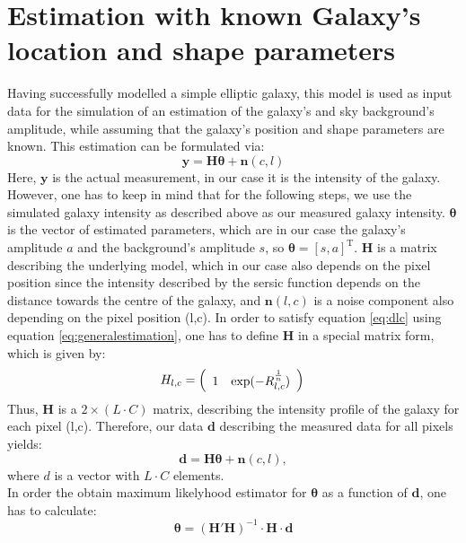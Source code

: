 \section{Estimation with known Galaxy's location and shape parameters}
Having successfully modelled a simple elliptic galaxy, this model is used as input data for the simulation of an estimation of the galaxy's and sky background's amplitude, while assuming that the galaxy's position and shape parameters are known. This estimation can be formulated via:
\begin{equation}
\boldsymbol{y}=\boldsymbol{H}\boldsymbol{\theta}+\boldsymbol{n}(c,l)
\label{eq:generalestimation}
\end{equation}
Here, $\boldsymbol{y}$ is the actual measurement, in our case it is the intensity of the galaxy. However, one has to keep in mind that for the  following steps, we use the simulated galaxy intensity as described above as our measured galaxy intensity. $\boldsymbol{\theta}$ is the vector of estimated parameters, which are in our case the galaxy's amplitude $a$ and the background's amplitude $s$, so $\boldsymbol{\theta}=[s,a]^{\mathrm{T}}$. $\boldsymbol{H}$ is a matrix describing the underlying model, which in our case also depends on the pixel position since the intensity described by the sersic function depends on the distance towards the centre of the galaxy, and $\boldsymbol{n}(l,c)$ is a noise component also depending on the pixel position (l,c). In order to satisfy equation \ref{eq:dlc} using equation \ref{eq:generalestimation}, one has to define $\boldsymbol{H}$ in a special matrix form, which is given by:
\begin{equation}
H_{l,c}=\left(\begin{array}{cc}1& \exp(-R_{l,c}^{\frac{1}{n}}) \end{array}\right)\\
\end{equation}
Thus, $\boldsymbol{H}$ is a $2\times (L\cdot C)$ matrix, describing the intensity profile of the galaxy for each pixel (l,c). Therefore, our data $\boldsymbol{d}$ describing the measured data for all pixels yields:
\begin{equation}
\boldsymbol{d}=\boldsymbol{H}\boldsymbol{\theta}+\boldsymbol{n}(c,l),
\label{eq:generalestimation}
\end{equation}
where $d$ is a vector with $L\cdot C$ elements.\\
\newline
In order the obtain maximum likelyhood estimator for $\boldsymbol{\theta}$ as a function of $\boldsymbol{d}$, one has to calculate:
\begin{equation}
\boldsymbol{\theta}=\left(\boldsymbol{H'H}\right)^{-1}\cdot\boldsymbol{H}\cdot\boldsymbol{d}
\end{equation}

